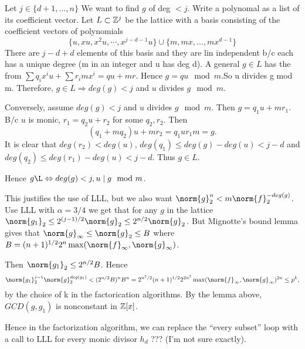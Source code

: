Let $j\in \{d+1, \dots, n\}$ We want  to  find  $g$ of  deg $< j$. Write a polynomal  as  a  list of its coefficient  vector. Let  $L \subset \mathbb Z^j$  be the  lattice  with  a basis consisting of the coefficient vectors of polynomials \[\{u, xu,  x^2u,  \cdots, x^{j-d-1}u\}\cup\{m, mx, \dots, mx^{d-1}\}\]  There are $j-d +d$ elements of this basis  and  they are  lin  independent  b/c each has a unique  degree (m in an  integer and u has deg d). A general $g \in L$ has the from $\sum  q_ix^iu + \sum r_imx^i = qu +mr$. Hence $g=qu \mod m$.So  u divides g mod m. Therefore, $g \in L \Rightarrow deg(g) < j$ and $u$ divides $g \mod m$.

Conversely, assume $deg(g) <  j$ and $u$ divides $g \mod m$. Then $g=q_1u +mr_1$. B/c $u$ is monic, $r_1 = q_2u + r_2$  for some $q_2, r_2$. Then\[(q_1 + mq_2)u +  mr_2 =  q_1u r_1m = g.\] It is clear that $deg(r_2) <  deg(u)$, $deg(q_1) \leq  deg(g)  -  deg(u) < j-d$ and $deg(q_2)\leq deg(r_1)-deg(u) < j-d$. Thus $g \in  L$.

Hence $g \L \Leftrightarrow deg(g) < j, u\mid g \mod m$.

This  justifies  the use of  LLL, but we also  want $\norm{g}_2^n < m \norm{f}_2^{-deg(g)}$. Use LLL with $\alpha=3/4$ we get that  for any $g$ in the lattice $\norm{g_1}_2 \leq 2^{(j-1)/2}\norm{g}_2  \leq 2^{n/2}\norm{g}_2$. But Mignotte's bound lemma gives that  $\norm{g}_\infty \leq \norm{g}_2  \leq B$  where  $B=(n+1)^{1/2}2^n\max(\norm{f}_\infty,\norm{g}_\infty)$.

Then $\norm{g_1}_2\leq 2^{n/2}B$. Hence \[\norm{g_1}_2^{j-1}\norm{g}_2^{deg(g_1)} < (2^{n/2}B)^nB^n = 2^{n^2/2}(n+1)^{1/2}2^{2n^2}\max(\norm{f}_\infty,\norm{g}_\infty)^{2n} \leq p^k,\] by the choice of k in the factorication algorithms. By the lemma above, $GCD(g,g_1)$ is nonconstant in $\mathbb Z[x]$.

Hence in the factorization algorithm, we  can replace the ``every subset'' loop with a call to LLL for every monic divisor  $h_d$ ??? (I'm  not sure exactly).


